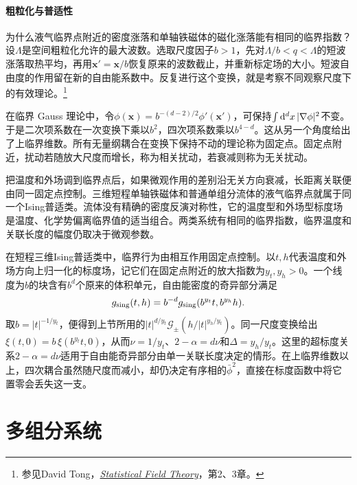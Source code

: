 \paragraph{粗粒化与普适性}
为什么液气临界点附近的密度涨落和单轴铁磁体的磁化涨落能有相同的临界指数？设$\Lambda$是空间粗粒化允许的最大波数。选取尺度因子$b > 1$，先对$\Lambda/b < q < \Lambda$的短波涨落取热平均，再用$\bm x' = \bm x/b$恢复原来的波数截止，并重新标定场的大小。短波自由度的作用留在新的自由能系数中。反复进行这个变换，就是考察不同观察尺度下的有效理论。\footnote{参见David Tong，\href{https://davidtong.org/teaching/statistical-field-theory/}{\textit{Statistical Field Theory}}，第2、3章。}

在临界 Gauss 理论中，令$\phi(\bm x) = b^{-(d-2)/2}\phi'(\bm x')$，可保持$\textstyle \int \mathop{}\!\mathrm{d}^d x\,|\nabla\phi|^2$不变。于是二次项系数在一次变换下乘以$b^2$，四次项系数乘以$b^{4-d}$。这从另一个角度给出了上临界维数。所有无量纲耦合在变换下保持不动的理论称为固定点。固定点附近，扰动若随放大尺度而增长，称为相关扰动，若衰减则称为无关扰动。

把温度和外场调到临界点后，如果微观作用的差别沿无关方向衰减，长距离关联便由同一固定点控制。三维短程单轴铁磁体和普通单组分流体的液气临界点就属于同一个Ising普适类。流体没有精确的密度反演对称性，它的温度型和外场型标度场是温度、化学势偏离临界值的适当组合。两类系统有相同的临界指数，临界温度和关联长度的幅度仍取决于微观参数。

在短程三维Ising普适类中，临界行为由相互作用固定点控制。以$t,h$代表温度和外场方向上归一化的标度场，记它们在固定点附近的放大指数为$y_t,y_h > 0$。一个线度为$b$的块含有$b^d$个原来的体积单元，自由能密度的奇异部分满足
\begin{equation}
    \label{eq:sm-homogeneity-scaling}
    g_{\rm sing}(t,h) = b^{-d}g_{\rm sing}(b^{y_t}t,b^{y_h}h).
\end{equation}
取$b = |t|^{-1/y_t}$，便得到上节所用的$|t|^{d/y_t}\mathcal G_\pm(h/|t|^{y_h/y_t})$。同一尺度变换给出$\xi(t,0) = b\,\xi(b^{y_t}t,0)$，从而$\nu = 1/y_t$、$2 - \alpha = d\nu$和$\Delta = y_h/y_t$。这里的超标度关系$2 - \alpha = d\nu$适用于自由能奇异部分由单一关联长度决定的情形。在上临界维数以上，四次耦合虽然随尺度而减小，却仍决定有序相的$\bar\phi^2$，直接在标度函数中将它置零会丢失这一支。

\section{多组分系统}

